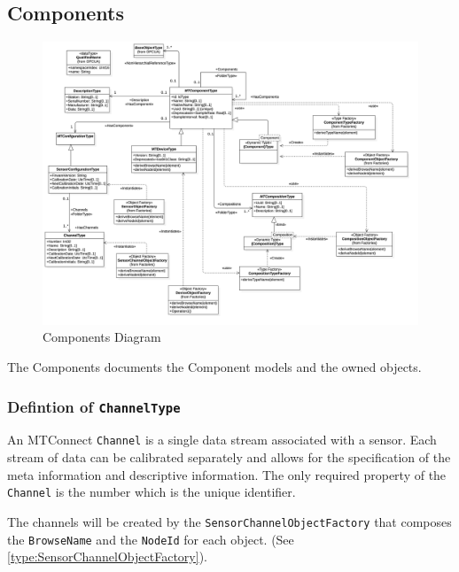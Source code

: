 \subsection{Components}

\begin{figure}
  \centering
    \includegraphics[width=1.0\textwidth]{diagrams/Components.png}
  \caption{Components Diagram}
  \label{fig:Components}
\end{figure}

\FloatBarrier


The Components documents the Component models and the owned objects.

\subsubsection{Defintion of  \texttt{ChannelType}} \label{type:ChannelType}

\FloatBarrier

An MTConnect \texttt{Channel} is a single data stream associated with a sensor. Each stream
of data can be calibrated separately and allows for the specification of the meta information
and descriptive information. The only required property of the \texttt{Channel} is the number
which is the unique identifier.

The channels will be created by the \texttt{SensorChannelObjectFactory} that composes the \texttt{BrowseName} 
and the \texttt{NodeId} for each object. (See \ref{type:SensorChannelObjectFactory}).

